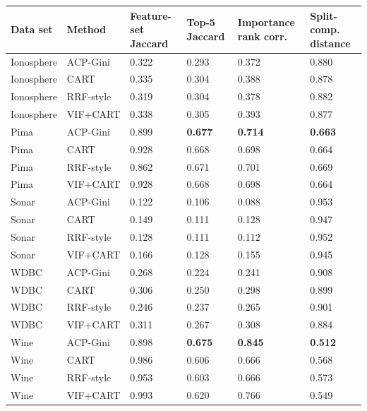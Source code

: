 \begin{tabular}{llllll}
\toprule
Data set & Method & Feature-set Jaccard & Top-5 Jaccard & Importance rank corr. & Split-comp. distance \\
\midrule
Ionosphere & ACP-Gini & 0.322 & 0.293 & 0.372 & 0.880 \\
Ionosphere & CART & 0.335 & 0.304 & 0.388 & 0.878 \\
Ionosphere & RRF-style & 0.319 & 0.304 & 0.378 & 0.882 \\
Ionosphere & VIF+CART & 0.338 & 0.305 & 0.393 & 0.877 \\
Pima & ACP-Gini & 0.899 & \textbf{0.677} & \textbf{0.714} & \textbf{0.663} \\
Pima & CART & 0.928 & 0.668 & 0.698 & 0.664 \\
Pima & RRF-style & 0.862 & 0.671 & 0.701 & 0.669 \\
Pima & VIF+CART & 0.928 & 0.668 & 0.698 & 0.664 \\
Sonar & ACP-Gini & 0.122 & 0.106 & 0.088 & 0.953 \\
Sonar & CART & 0.149 & 0.111 & 0.128 & 0.947 \\
Sonar & RRF-style & 0.128 & 0.111 & 0.112 & 0.952 \\
Sonar & VIF+CART & 0.166 & 0.128 & 0.155 & 0.945 \\
WDBC & ACP-Gini & 0.268 & 0.224 & 0.241 & 0.908 \\
WDBC & CART & 0.306 & 0.250 & 0.298 & 0.899 \\
WDBC & RRF-style & 0.246 & 0.237 & 0.265 & 0.901 \\
WDBC & VIF+CART & 0.311 & 0.267 & 0.308 & 0.884 \\
Wine & ACP-Gini & 0.898 & \textbf{0.675} & \textbf{0.845} & \textbf{0.512} \\
Wine & CART & 0.986 & 0.606 & 0.666 & 0.568 \\
Wine & RRF-style & 0.953 & 0.603 & 0.666 & 0.573 \\
Wine & VIF+CART & 0.993 & 0.620 & 0.766 & 0.549 \\
\bottomrule
\end{tabular}
